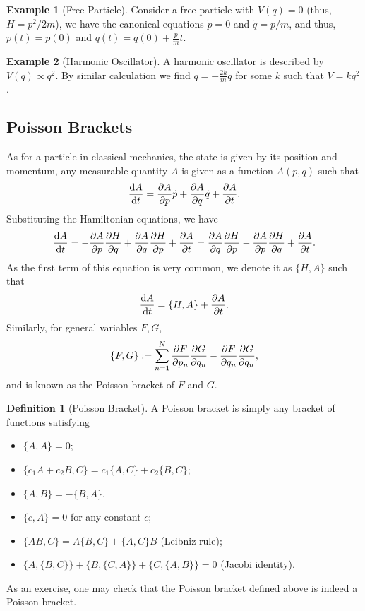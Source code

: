 \documentclass[]{article}
\theoremstyle{definition}
\theoremstyle{definition}
\newtheorem{definition}{Definition}[section]
\newtheorem{example}{Example}[section]
\begin{document}
\begin{example}[Free Particle]
  Consider a free particle with \(V(q) = 0\) (thus, \(H = p^2 / 2m\)), we have 
  the canonical equations \(\dot p = 0\) and \(\dot q = p / m\), and thus, 
  \(p(t) = p(0)\) and \(q(t) = q(0) + \frac{p}{m} t\).
\end{example}

\begin{example}[Harmonic Oscillator]
  A harmonic oscillator is described by \(V(q) \propto q^2\). By similar calculation 
  we find \(\ddot q = - \frac{2k}{m} q\) for some \(k\) such that \(V = k q^2\).
\end{example}

\subsection{Poisson Brackets}

As for a particle in classical mechanics, the state is given by its position and 
momentum, any measurable quantity \(A\) is given as a function \(A(p, q)\) 
such that 
\[\dv{A}{t} = \pdv{A}{p}\dot p + \pdv{A}{q} \dot q + \pdv{A}{t}.\]
Substituting the Hamiltonian equations, we have 
\[\dv{A}{t} = - \pdv{A}{p} \pdv{H}{q} + \pdv{A}{q} \pdv{H}{p} + \pdv{A}{t}
  = \pdv{A}{q} \pdv{H}{p} - \pdv{A}{p} \pdv{H}{q} + \pdv{A}{t}.\]
As the first term of this equation is very common, we denote it as \(\{H, A\}\) 
such that 
\[\dv{A}{t} = \{H, A\} + \pdv{A}{t}.\] 
Similarly, for general variables \(F, G\), 
\[\{F, G\} := \sum_{n = 1}^N \pdv{F}{p_n}\pdv{G}{q_n} - \pdv{F}{q_n}\pdv{G}{q_n},\]
and is known as the Poisson bracket of \(F\) and \(G\).

\begin{definition}[Poisson Bracket]
  A Poisson bracket is simply any bracket of functions satisfying 
  \begin{itemize}
    \item \(\{A, A\} = 0\);
    \item \(\{c_1 A + c_2 B, C\} = c_1\{A, C\} + c_2\{B, C\}\);
    \item \(\{A, B\} = -\{B, A\}\).
    \item \(\{c, A\} = 0\) for any constant \(c\);
    \item \(\{AB, C\} = A\{B, C\} + \{A, C\}B\) (Leibniz rule);
    \item \(\{A, \{B, C\}\} + \{B, \{C, A\}\} + \{C, \{A, B\}\} = 0\) (Jacobi identity).
  \end{itemize}
\end{definition}
As an exercise, one may check that the Poisson bracket defined above is indeed 
a Poisson bracket.
\end{document}
